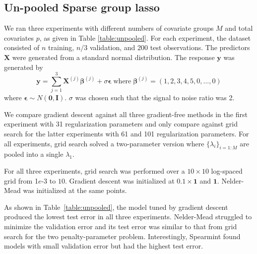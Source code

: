 \documentclass[12pt]{article}
\begin{document}
\subsection{Un-pooled Sparse group lasso}\label{sec:simulation_sgl}
We ran three experiments with different numbers of covariate groups $M$ and total covariates $p$, as given in Table \ref{table:unpooled}. For each experiment, the dataset consisted of $n$ training, $n/3$ validation, and 200 test observations. The predictors $\boldsymbol X$ were generated from a standard normal distribution. The response $\boldsymbol y$ was generated by
\begin{equation}
\boldsymbol y = \sum\limits_{j=1}^3 \boldsymbol X^{(j)} \boldsymbol \beta^{(j)} + \sigma \boldsymbol \epsilon \; \text{where} \; \boldsymbol \beta^{(j)} = (1, 2, 3, 4, 5, 0, ..., 0)
\end{equation}
where $\boldsymbol \epsilon \sim N(\boldsymbol 0, \boldsymbol I)$. $\sigma$ was chosen such that the signal to noise ratio was 2. 

We compare gradient descent against all three gradient-free methods in the first experiment with 31 regularization parameters and only compare against grid search for the latter experiments with 61 and 101 regularization parameters. For all experiments, grid search solved a two-parameter version where $\{\lambda_i\}_{i=1:M}$ are pooled into a single $\lambda_1$.

For all three experiments, grid search was performed over a $10 \times 10$ log-spaced grid from 1$e$-3 to $10$. Gradient descent was initialized at $0.1 \times \boldsymbol 1$ and $\boldsymbol 1$. Nelder-Mead was initialized at the same points.

As shown in Table~\ref{table:unpooled}, the model tuned by gradient descent produced the lowest test error in all three experiments. Nelder-Mead struggled to minimize the validation error and its test error was similar to that from grid search for the two penalty-parameter problem. Interestingly, Spearmint found models with small validation error but had the highest test error.
\end{document}
